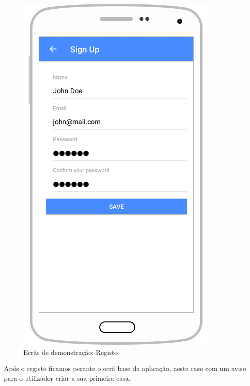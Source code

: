 \begin{figure}[H]
  \centering
        \includegraphics[scale=0.6]{img/demo/register.png}
  \caption{Ecrãs de demonstração: Registo}
\end{figure}

Após o registo ficamos perante o ecrã base da aplicação, neste caso com um aviso para o utilizador criar a sua primeira casa. 

